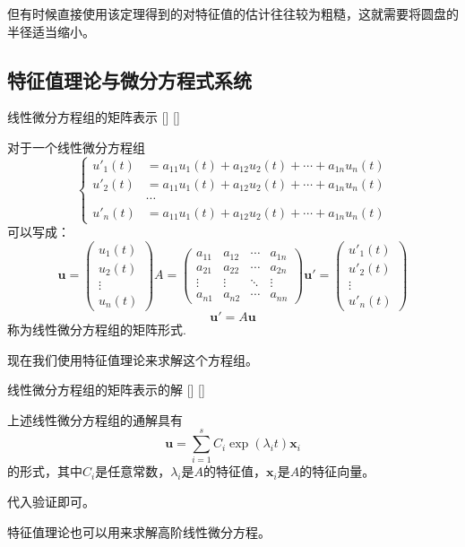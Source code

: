 \documentclass[UTF8]{ctexart}
\begin{document}
		但有时候直接使用该定理得到的对特征值的估计往往较为粗糙，这就需要将圆盘的半径适当缩小。

	\subsection{特征值理论与微分方程式系统}
		
		\begin{dfn}
			[]
			{线性微分方程组的矩阵表示}
			[]
			[]

			对于一个线性微分方程组\[ \begin{cases}
				u'_1(t)&=a_{11}u_1(t)+a_{12}u_2(t)+\cdots+a_{1n}u_n(t)\\
				u'_2(t)&=a_{11}u_1(t)+a_{12}u_2(t)+\cdots+a_{1n}u_n(t)\\
				&\cdots\\
				u'_n(t)&=a_{11}u_1(t)+a_{12}u_2(t)+\cdots+a_{1n}u_n(t)
			\end{cases}
			\]
			可以写成：
			\[ \mathbf{u}=\begin{pmatrix}
				u_{1}(t)\\u_{2}(t)\\\vdots\\u_{n}(t)
			\end{pmatrix}
			A=\begin{pmatrix}
				a_{11}&a_{12}&\cdots&a_{1n}\\a_{21}&a_{22}&\cdots&a_{2n}\\\vdots&\vdots&\ddots&\vdots\\a_{n1}&a_{n2}&\cdots&a_{nn}
			\end{pmatrix}
			\mathbf{u}'=\begin{pmatrix}
				u'_{1}(t)\\u'_{2}(t)\\\vdots\\u'_{n}(t)
			\end{pmatrix}
			\]
			\[\mathbf{u}'=A\mathbf{u}  
			\]
			称为线性微分方程组的矩阵形式.
		\end{dfn}
		现在我们使用特征值理论来求解这个方程组。
		\begin{thm}
			[]
			{线性微分方程组的矩阵表示的解}
			[]
			[]

			上述线性微分方程组的通解具有\[\mathbf{u}=\sum_{i=1}^{s}C_i\exp(\lambda_i t)\mathbf{x}_i
			\]
			的形式，其中$C_i$是任意常数，$\lambda_i$是$A$的特征值，$\mathbf{x}_i$是$A$的特征向量。
		\end{thm}
		\begin{prf}
			代入验证即可。
		\end{prf}
		特征值理论也可以用来求解高阶线性微分方程。
		
\end{document}
